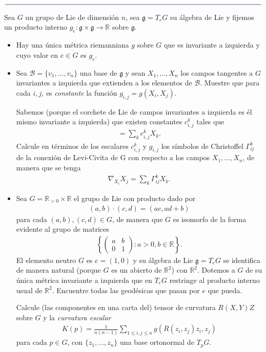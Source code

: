 \documentclass[11pt]{article}
\newcommand{\R}{\mathbb{R}}
\newcommand{\paint}[1]{\color{color}{#1}}
\newcommand{\paintline}{\begin{center}
$\paint{
\rule{400pt}{0.5pt}
}$
\vspace{10pt}
\end{center}}
\newenvironment{exercise}[2][Ejercicio]{\begin{trivlist}
\item[\hskip \labelsep \paint{{\bfseries #1}}\hskip \labelsep {\bfseries #2.}]}{\end{trivlist}}
\begin{document}
\paintline

\begin{exercise}{5} Sea $G$ un grupo de Lie de dimensión $n$, sea $\mathfrak{g} = T_eG$ su álgebra de Lie y fijemos un producto interno $g_e : \mathfrak{g} \times \mathfrak{g} \to \R$ sobre $\mathfrak{g}$.
\begin{itemize}[listparindent = \parindent]
\item[(a)] Hay una única métrica riemanniana $g$ sobre $G$ que es invariante a izquierda y cuyo valor en $e \in G$ es $g_e$.
\item[(b)] Sea $\mathscr{B} = \{v_1, \dots, v_n\}$ una base de $\mathfrak{g}$ y sean $X_1, \dots, X_n$ los campos tangentes a $G$ invariantes a izquierda que extienden a los elementos de $\mathscr{B}$. Muestre que para cada $i,j$, es \textit{constante} la función $g_{i,j} = g(X_i,X_j)$.

Sabemos (porque el corchete de Lie de campos invariantes a izquierda es él mismo invariante a izquierda) que existen constantes $c_{i,j}^k$ tales que
\begin{align*}
[X_i,X_j] = \sum_{k}c_{i,j}^kX_k.
\end{align*}
Calcule en términos de los escalares $c_{i,j}^k$ y $g_{i,j}$ los símbolos de Christoffel $\Gamma_{ij}^k$ de la conexión de Levi-Civita de G con respecto a los campos $X_1, \dots, X_n$, de manera que se tenga
\begin{align*}
\nabla_{X_i}X_j = \sum_k\Gamma_{ij}^kX_k.
\end{align*}
\item[(c)] Sea $G = \R_{>0 } \times \R$ el grupo de Lie con producto dado por
\begin{align*}
(a,b) \cdot (c,d) = (ac,ad+b)
\end{align*}
para cada $(a,b),(c,d) \in G$, de manera que $G$ es isomorfo de la forma evidente al grupo de matrices 
\begin{align*}
\left\{\begin{pmatrix}
a & b \\
0 & 1
\end{pmatrix} : a >0, b \in \R\right\}.
\end{align*}
El elemento neutro $G$ es $e = (1,0)$ y su álgebra de Lie $\mathfrak{g} = T_eG$ se identifica de manera natural (porque $G$ es un abierto de $\R^2$) con $\R^2$. Dotemos a $G$ de su única métrica invariante a izquierda que en $T_eG$ restringe al producto interno usual de $\R^2$. Encuentre todas las geodésicas que pasan por $e$ que pueda.

Calcule (las componentes en una carta del) tensor de curvatura $R(X,Y)Z$ sobre $G$ y la \textit{curvatura escalar}
\begin{align*}
K(p) = \frac{1}{n(n-1)} \sum_{1 \leq i,j \leq n}g(R(z_i,z_j)z_i,z_j)
\end{align*}
para cada $p \in G$, con $\{z_1, \dots, z_n\}$ una base ortonormal de $T_pG$.
\end{itemize}
\end{exercise}
\end{document}
